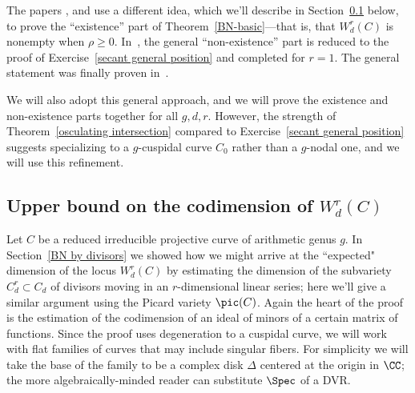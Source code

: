 
The papers \cite{MR323792}, \cite{MR0357398} and \cite{Kempf} use a different  idea, which we'll describe in Section~\ref{upper bound} below,
to prove the ``existence'' part of Theorem~\ref{BN-basic}---that is, that $W^{r}_{d}(C)$ is nonempty when
$\rho\geq 0$. In~\cite{Kleiman-special},  the general ``non-existence'' part is reduced to the proof of Exercise~\ref{secant general position} and completed for $r=1$. The general statement was finally proven in~\cite{Griffiths-Harris-BN}.

We will also adopt this general approach, and we will prove the existence and non-existence parts together
for all $g,d,r$. However, the strength of Theorem~\ref{osculating intersection} compared to Exercise~\ref{secant general position} suggests specializing to a $g$-cuspidal curve $C_0$ rather than a $g$-nodal one, and we will use
this refinement. 

\subsection{Upper bound on the codimension of $W^r_d(C)$}\label{upper bound}

Let $C$ be a reduced irreducible projective curve of arithmetic genus $g$.  In Section~\ref{BN by divisors} we showed how we might arrive at the ``expected" dimension of the locus $W^r_d(C)$ by estimating the dimension of the subvariety $C^r_d \subset C_d$ of divisors moving in an $r$-dimensional linear series; here we'll give a similar argument using the Picard variety $\pic(C)$. Again the heart of the proof is the estimation of the
codimension of an ideal of minors of a certain matrix of functions. Since the proof uses degeneration
to a cuspidal curve, we will work with flat families of curves that may include singular fibers. For simplicity
we will take the base of the family to be a complex disk $\Delta$ centered at the origin in $\CC$; the more algebraically-minded reader can substitute $\Spec$ of a DVR.

